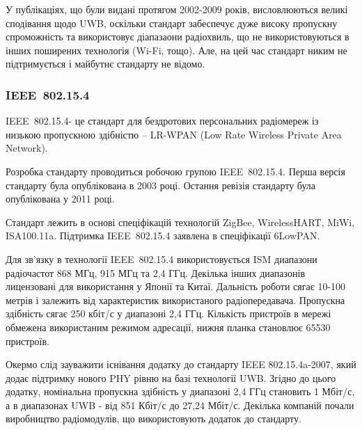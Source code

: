 \documentclass[a4paper,ukrainian,utf8,nocolumnsxix,floatsection,equationsection]{eskdtext}
\renewcommand\paragraph{\subsubsection}
\newcommand{\todoi}[1]{\todo[inline]{#1}}
\newcommand{\iee}[0]{IEEE~802.15.4\xspace}
\newcommand{\engtxt}[1]{\foreignlanguage{english}{#1}}
\begin{document}

У публікаціях, що були видані протягом 2002-2009 років, висловлюються великі сподівання щодо UWB, оскільки стандарт забеспечує дуже високу пропускну спроможність та використовує діапазаони радіохвиль, що не використовуються в інших поширених технологія (Wi-Fi, тощо). Але, на цей час стандарт никим не підтримується і майбутнє стандарту не відомо.


\paragraph{\iee} %
\label{par:iee}

\iee - це стандарт для бездротових персональних радіомереж із низькою пропускною здібністю – LR-WPAN (\engtxt{Low Rate Wireless Private Area Network}). 

Розробка стандарту проводиться робочою групою \iee. Перша версія стандарту була опублікована в 2003 році. Остання ревізія стандарту була опублікована у 2011 році. 

Стандарт лежить в основі спеціфікацій технологій ZigBee, WirelessHART, MiWi, ISA100.11a. Підтримка \iee заявлена в спеціфікації 6LowPAN.

Для зв’язку в технології \iee використовується ISM диапазони радіочастот 868 МГц, 915 МГц та 2,4 ГГц. Декілька інших диапазонів лицензовані для використання у Японії та Китаї. Дальність роботи сягає 10-100 метрів і залежить від характеристик використаного радіопередавача. Пропускна здібність сягає 250 кбіт/с у диапазоні 2,4 ГГц. Кількість пристроїв в мережі обмежена використаним режимом адресації, нижня планка становлює 65530 пристроїв.

Окермо слід зауважити існівання додатку до стандарту IEEE 802.15.4a-2007, який додає підтримку нового PHY рівню на базі технології UWB. Згідно до цього додатку, номінальна пропускна здібність у диапазоні 2,4 ГГц становить 1 Мбіт/с, а в диапазонах UWB - від 851 Кбіт/с до 27,24 Мбіт/с. Декілька компаній почали виробництво радіомодулів, що використовують додаток до стандарту.



\todoi{інші технології?}
\end{document}
